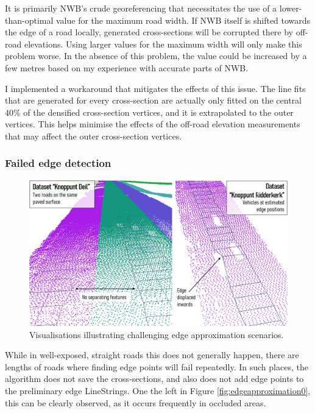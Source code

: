 It is primarily NWB's crude georeferencing that necessitates the use of a lower-than-optimal value for the maximum road width. If NWB itself is shifted towards the edge of a road locally, generated cross-sections will be corrupted there by off-road elevations. Using larger values for the maximum width will only make this problem worse. In the absence of this problem, the value could be increased by a few metres based on my experience with accurate parts of NWB.

I implemented a workaround that mitigates the effects of this issue. The line fits that are generated for every cross-section are actually only fitted on the central 40\% of the densified cross-section vertices, and it is extrapolated to the outer vertices. This helps minimise the effects of the off-road elevation measurements that may affect the outer cross-section vertices. 

\subsubsection{Failed edge detection}

\begin{figure}
    \centering
    \includegraphics[width=\linewidth]{final_report/figs/edgeapproximation1.png}
    \caption{Visualisations illustrating challenging edge approximation scenarios.}
    \label{fig:edgeapproximation1}
\end{figure}

While in well-exposed, straight roads this does not generally happen, there are lengths of roads where finding edge points will fail repeatedly. In such places, the algorithm does not save the cross-sections, and also does not add edge points to the preliminary edge LineStrings. One the left in Figure \ref{fig:edgeapproximation0}, this can be clearly observed, as it occurs frequently in occluded areas.

